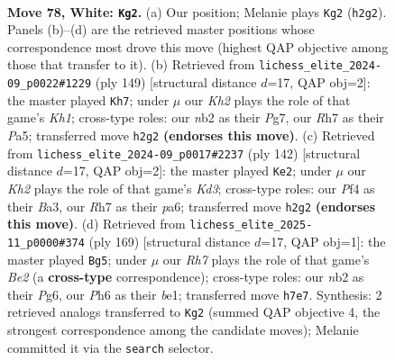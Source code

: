 \documentclass[11pt]{article}
\begin{document}
\clearpage

\begin{figure}[p]\centering
\begin{subfigure}{0.46\textwidth}\centering
\resizebox{\linewidth}{!}{%
\newchessgame
\chessboard[
  setfen={8/7R/6pP/3k1p2/5P2/p7/1n5K/8 w - - 2 78},
  showmover=false,
  pgfstyle=straightmove, color=movearrow, markmove={h2-g2}
]}
\caption{}
\end{subfigure}\hfill
\begin{subfigure}{0.46\textwidth}\centering
\resizebox{\linewidth}{!}{%
\newchessgame
\chessboard[
  setfen={7k/6p1/8/p4K1p/P1B4P/6P1/8/8 b - - 0 75},
  showmover=false,
  pgfstyle=straightmove, color=movearrow, markmove={h8-h7}
]}
\caption{}
\end{subfigure}
\\[4pt]
\begin{subfigure}{0.46\textwidth}\centering
\resizebox{\linewidth}{!}{%
\newchessgame
\chessboard[
  setfen={8/2k5/p7/4p2p/P3P1nP/B2K4/8/8 w - - 20 72},
  showmover=false,
  pgfstyle=straightmove, color=movearrow, markmove={d3-e2}
]}
\caption{}
\end{subfigure}\hfill
\begin{subfigure}{0.46\textwidth}\centering
\resizebox{\linewidth}{!}{%
\newchessgame
\chessboard[
  setfen={8/4b3/6p1/3kp3/6P1/3K1P2/8/4B3 b - - 7 85},
  showmover=false,
  pgfstyle=straightmove, color=movearrow, markmove={e7-g5}
]}
\caption{}
\end{subfigure}
\caption{\textbf{Move 78, White: \texttt{Kg2}.} (a) Our position; Melanie plays \texttt{Kg2} (\texttt{h2g2}). Panels (b)--(d) are the retrieved master positions whose correspondence most drove this move (highest QAP objective among those that transfer to it). (b) Retrieved from \texttt{lichess\_elite\_2024-09\_p0022\#1229} (ply 149) [structural distance $d$=17, QAP obj=2]: the master played \texttt{Kh7}; under $\mu$ our \emph{Kh2} plays the role of that game's \emph{Kh1}; cross-type roles: our \emph{n}b2 as their \emph{P}g7, our \emph{R}h7 as their \emph{P}a5; transferred move \texttt{h2g2} \textbf{(endorses this move)}. (c) Retrieved from \texttt{lichess\_elite\_2024-09\_p0017\#2237} (ply 142) [structural distance $d$=17, QAP obj=2]: the master played \texttt{Ke2}; under $\mu$ our \emph{Kh2} plays the role of that game's \emph{Kd3}; cross-type roles: our \emph{P}f4 as their \emph{B}a3, our \emph{R}h7 as their \emph{p}a6; transferred move \texttt{h2g2} \textbf{(endorses this move)}. (d) Retrieved from \texttt{lichess\_elite\_2025-11\_p0000\#374} (ply 169) [structural distance $d$=17, QAP obj=1]: the master played \texttt{Bg5}; under $\mu$ our \emph{Rh7} plays the role of that game's \emph{Be2} (a \textbf{cross-type} correspondence); cross-type roles: our \emph{n}b2 as their \emph{P}g6, our \emph{P}h6 as their \emph{b}e1; transferred move \texttt{h7e7}. Synthesis: 2 retrieved analogs transferred to \texttt{Kg2} (summed QAP objective 4, the strongest correspondence among the candidate moves); Melanie committed it via the \texttt{search} selector.}
\label{fig:thought-m154}
\end{figure}
\end{document}
